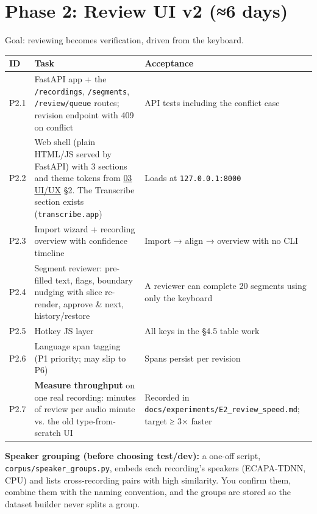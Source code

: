 \documentclass[11pt]{article}
\begin{document}
\hypertarget{phase-2-review-ui-v2-6-days}{%
\section{Phase 2: Review UI v2 (≈6 days)}\label{phase-2-review-ui-v2-6-days}}

Goal: reviewing becomes verification, driven from the keyboard.

\begin{longtable}[]{@{}>{\raggedright\arraybackslash}p{}>{\raggedright\arraybackslash}p{}>{\raggedright\arraybackslash}p{}@{}}
\toprule\noalign{}
ID & Task & Acceptance \\
\midrule\noalign{}
\endhead
\bottomrule\noalign{}
\endlastfoot
P2.1 & FastAPI app + the \texttt{/\allowbreak{}recordings}, \texttt{/\allowbreak{}segments}, \texttt{/\allowbreak{}review/\allowbreak{}queue} routes; revision endpoint with 409 on conflict & API tests including the conflict case \\
P2.2 & Web shell (plain HTML/JS served by FastAPI) with 3 sections and theme tokens from \href{03_UI_UX_DESIGN.pdf}{03 UI/UX} §2. The Transcribe section exists (\texttt{transcribe.app}) & Loads at \texttt{127.\allowbreak{}0.\allowbreak{}0.\allowbreak{}1:8000} \\
P2.3 & Import wizard + recording overview with confidence timeline & Import → align → overview with no CLI \\
P2.4 & Segment reviewer: pre-filled text, flags, boundary nudging with slice re-render, approve \& next, history/restore & A reviewer can complete 20 segments using only the keyboard \\
P2.5 & Hotkey JS layer & All keys in the §4.5 table work \\
P2.6 & Language span tagging (P1 priority; may slip to P6) & Spans persist per revision \\
P2.7 & \textbf{Measure throughput} on one real recording: minutes of review per audio minute vs. the old type-from-scratch UI & Recorded in \texttt{docs/\allowbreak{}experiments/\allowbreak{}E2\_\allowbreak{}review\_\allowbreak{}speed.\allowbreak{}md}; target ≥ 3× faster \\
\end{longtable}

\textbf{Speaker grouping (before choosing test/dev):} a one-off script, \texttt{corpus/speaker\_groups.py}, embeds each recording's speakers (ECAPA-TDNN, CPU) and lists cross-recording pairs with high similarity. You confirm them, combine them with the naming convention, and the groups are stored so the dataset builder never splits a group.
\end{document}
